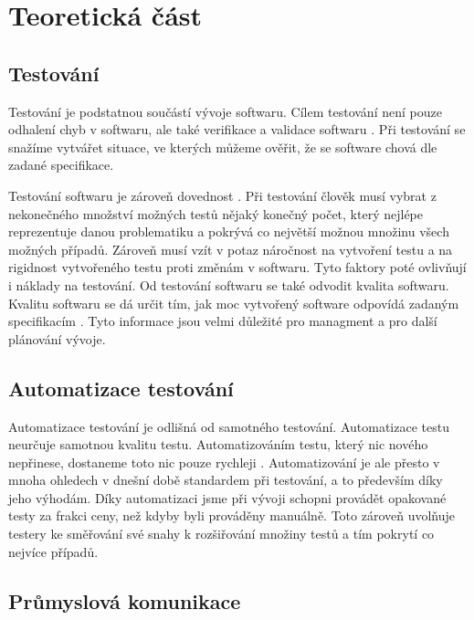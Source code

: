 \chapter{Teoretická část} %

\section{Testování}

Testování je podstatnou součástí vývoje softwaru. Cílem testování není pouze odhalení chyb v softwaru, ale také verifikace a validace softwaru \cite{singh2012software}. Při testování se snažíme vytvářet situace, ve kterých můžeme ověřit, že se software chová dle zadané specifikace.

Testování softwaru je zároveň dovednost \cite{fewster1999software}. Při testování člověk musí vybrat z nekonečného množství možných testů nějaký konečný počet, který nejlépe reprezentuje danou problematiku a pokrývá co největší možnou množinu všech možných případů. Zároveň musí vzít v potaz náročnost na vytvoření testu a na rigidnost vytvořeného testu proti změnám v softwaru. Tyto faktory poté ovlivňují i náklady na testování. Od testování softwaru se také odvodit kvalita softwaru. Kvalitu softwaru se dá určit tím, jak moc vytvořený software odpovídá zadaným specifikacím \cite{software_quality}. Tyto informace jsou velmi důležité pro managment a pro další plánování vývoje. 

\section{Automatizace testování}

Automatizace testování je odlišná od samotného testování. Automatizace testu neurčuje samotnou kvalitu testu. Automatizováním testu, který nic nového nepřinese, dostaneme toto nic pouze rychleji \cite{fewster1999software}. Automatizování je ale přesto v mnoha ohledech v dnešní době standardem při testování, a to především díky jeho výhodám. Díky automatizaci jsme při vývoji schopni provádět opakované testy za frakci ceny, než kdyby byli prováděny manuálně. Toto zároveň uvolňuje testery ke směřování své snahy k rozšiřování množiny testů a tím pokrytí co nejvíce případů.


\section{Průmyslová komunikace}

